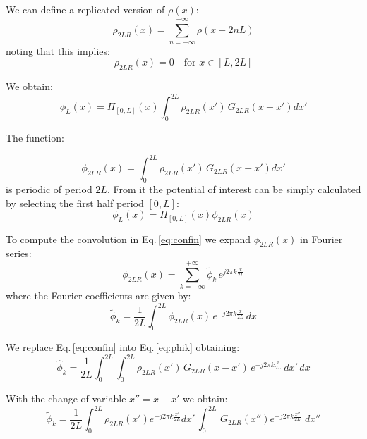 We can define a replicated version of $\rho(x)$:
\begin{equation}
\rho_{2LR}(x)= \sum_{n=-\infty}^{+\infty}
\rho(x-2nL)
\end{equation}
noting that this implies:
\begin{equation}
\rho_{2LR}(x)= 0 \quad \text{for } x \in [L, 2L]
\label{eq:zeros}
\end{equation}

We obtain:
\begin{equation}
\phi_L(x) = 
\Pi_{[0,L]}\left({x}\right)
\int_{0 }^{2L} 
\rho_{2LR}(x')\,G_{2LR}(x-x') dx'
\label{eq:conv6}
\end{equation}

The function:

\begin{equation}
\phi_{2LR}(x) = 
\int_{0 }^{2L} 
\rho_{2LR}(x')\,G_{2LR}(x-x') dx'
\label{eq:confin}
\end{equation}
is periodic of period $2L$. From it the potential of interest can be simply calculated by selecting the first half period $[0, L]$:
\begin{equation}
\phi_L(x) = 
\Pi_{[0,L]}\left({x}\right)
\phi_{2LR}(x)
\label{eq:sel}
\end{equation}

To compute the convolution in Eq.\,\ref{eq:confin} we expand $\phi_{2LR}(x)$ in Fourier series:
\begin{equation}
\phi_{2LR}(x) = \sum_{k=-\infty}^{+\infty} \tilde{\phi}_k\, e^{j2\pi k \frac{x}{2L}}
\label{eq:phifour}
\end{equation}
where the Fourier coefficients are given by:
\begin{equation}
\tilde{\phi}_k = \frac{1}{2L}\int_0^{2L} \phi_{2LR}(x)\, e^{-j2\pi k \frac{x}{2L}} \, dx
\label{eq:phik}
\end{equation}

We replace Eq.\,\eqref{eq:confin} into Eq.\,\eqref{eq:phik} obtaining:
\begin{equation}
\hat{\phi}_k = \frac{1}{2L}\int_0^{2L} \int_{0 }^{2L} 
\rho_{2LR}(x')\,G_{2LR}(x-x') \, e^{-j2\pi k \frac{x}{2L}} \,  dx'\, dx
\end{equation}

With the change of variable $x'' = x-x'$ we obtain:
\begin{equation}
\tilde{\phi}_k = 
\frac{1}{2L}
\int_0^{2L} 
\rho_{2LR}(x') e^{-j2\pi k \frac{x'}{2L}}dx'\,
\int_{0 }^{2L} 
\,G_{2LR}(x'') e^{-j2\pi k \frac{x''}{2L}}\,  \,  dx''
\end{equation}

